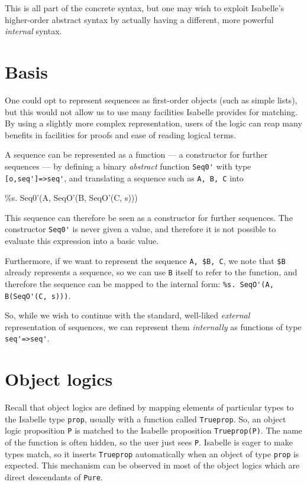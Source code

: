 This is all part of the concrete syntax, but one may wish to
exploit Isabelle's higher-order abstract syntax by actually having a
different, more powerful {\em internal} syntax.



\section{ Basis}

One could opt to represent sequences as first-order objects (such as
simple lists), but this would not allow us to use many facilities
Isabelle provides for matching.  By using a slightly more complex
representation, users of the logic can reap many benefits in
facilities for proofs and ease of reading logical terms.

A sequence can be represented as a function --- a constructor for
further sequences --- by defining a binary {\em abstract} function
\verb|Seq0'| with type \verb|[o,seq']=>seq'|, and translating a
sequence such as \verb|A, B, C| into
\begin{ttbox}
\%s. Seq0'(A, SeqO'(B, SeqO'(C, s)))  
\end{ttbox}
This sequence can therefore be seen as a constructor 
for further sequences. The constructor \verb|Seq0'| is never given a
value, and therefore it is not possible to evaluate this expression
into a basic value.

Furthermore, if we want to represent the sequence \verb|A, $B, C|,
we note that \verb|$B| already represents a sequence, so we can use
\verb|B| itself to refer to the function, and therefore the sequence
can be mapped to the internal form:
\verb|%s. SeqO'(A, B(SeqO'(C, s)))|.

So, while we wish to continue with the standard, well-liked {\em
external} representation of sequences, we can represent them {\em
internally} as functions of type \verb|seq'=>seq'|.


\section{Object logics}

Recall that object logics are defined by mapping elements of
particular types to the Isabelle type \verb|prop|, usually with a
function called {\tt Trueprop}. So, an object
logic proposition {\tt P} is matched to the Isabelle proposition
{\tt Trueprop(P)}\@.  The name of the function is often hidden, so the
user just sees {\tt P}\@. Isabelle is eager to make types match, so it
inserts {\tt Trueprop} automatically when an object of type {\tt prop}
is expected. This mechanism can be observed in most of the object
logics which are direct descendants of {\tt Pure}.

